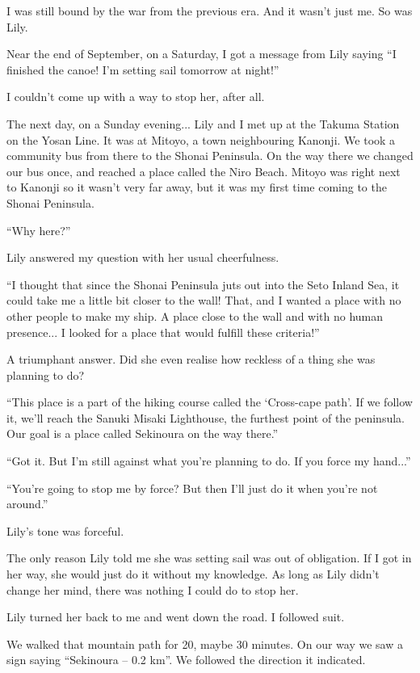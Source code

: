 I was still bound by the war from the previous era. And it wasn't just me. So was Lily.

Near the end of September, on a Saturday, I got a message from Lily saying ``I finished the canoe! I'm setting sail tomorrow at night!''

I couldn't come up with a way to stop her, after all.

The next day, on a Sunday evening... Lily and I met up at the Takuma Station on the Yosan Line.	It was at Mitoyo, a town neighbouring Kanonji. We took a community bus from there to the Shonai Peninsula. On the way there we changed our bus once, and reached a place called the Niro Beach. Mitoyo was right next to Kanonji so it wasn't very far away, but it was my first time coming to the Shonai Peninsula.

``Why here?''

Lily answered my question with her usual cheerfulness.

``I thought that since the Shonai Peninsula juts out into the Seto Inland Sea, it could take me a little bit closer to the wall! That, and I wanted a place with no other people to make my ship. A place close to the wall and with no human presence... I looked for a place that would fulfill these criteria!''

A triumphant answer. Did she even realise how reckless of a thing she was planning to do?

``This place is a part of the hiking course called the `Cross-cape path'. If we follow it, we'll reach the Sanuki Misaki Lighthouse, the furthest point of the peninsula. Our goal is a place called Sekinoura on the way there.''

``Got it. But I'm still against what you're planning to do. If you force my hand...''

``You're going to stop me by force? But then I'll just do it when you're not around.''

Lily's tone was forceful.

The only reason Lily told me she was setting sail was out of obligation. If I got in her way, she would just do it without my knowledge. As long as Lily didn't change her mind, there was nothing I could do to stop her.

Lily turned her back to me and went down the road. I followed suit.

We walked that mountain path for 20, maybe 30 minutes. On our way we saw a sign saying ``Sekinoura -- 0.2 km''. We followed the direction it indicated.

